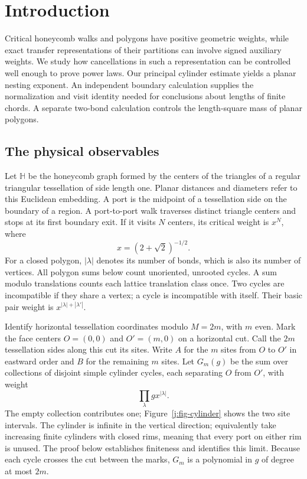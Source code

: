\section{Introduction}

Critical honeycomb walks and polygons have positive geometric weights,
while exact transfer representations of their partitions can involve
signed auxiliary weights. We study how cancellations in such a
representation can be controlled well enough to prove power laws. Our
principal cylinder estimate yields a planar nesting exponent. An
independent boundary calculation supplies the normalization and visit
identity needed for conclusions about lengths of finite chords. A separate
two-bond calculation controls the length-square mass of planar polygons.

\subsection{The physical observables}

Let $\mathbb H$ be the honeycomb graph formed by the centers of the
triangles of a regular triangular tessellation of side length one.
Planar distances and diameters refer to this Euclidean embedding.
A port is the midpoint of a tessellation side on the boundary of a region.
A port-to-port walk traverses distinct triangle centers and stops at its
first boundary exit. If it visits $N$ centers, its critical weight is
$x^N$, where
\[
 x=(2+\sqrt2)^{-1/2}.
\]
For a closed polygon, $|\lambda|$ denotes its number of bonds, which is
also its number of vertices. All polygon sums below count unoriented,
unrooted cycles. A sum modulo translations counts each lattice
translation class once.
Two cycles are incompatible if they share a vertex; a cycle is
incompatible with itself. Their basic pair weight is
$x^{|\lambda|+|\lambda'|}$.

Identify horizontal tessellation coordinates modulo $M=2m$, with $m$
even. Mark the face centers $O=(0,0)$ and $O'=(m,0)$ on a horizontal cut.
Call the $2m$ tessellation sides along this cut its sites. Write $A$ for
the $m$ sites from $O$ to $O'$ in eastward order and $B$ for the remaining
$m$ sites.
Let $G_m(g)$ be the sum over collections of disjoint simple cylinder
cycles, each separating $O$ from $O'$, with weight
\[
 \prod_{\lambda}g x^{|\lambda|}.
\]
The empty collection contributes one; Figure~\ref{j:fig-cylinder} shows
the two site intervals. The cylinder is infinite in the
vertical direction; equivalently take increasing finite cylinders with
closed rims, meaning that every port on either rim is unused. The proof
below establishes finiteness and identifies this limit. Because each
cycle crosses the cut between the marks, $G_m$ is a polynomial in $g$
of degree at most $2m$.

